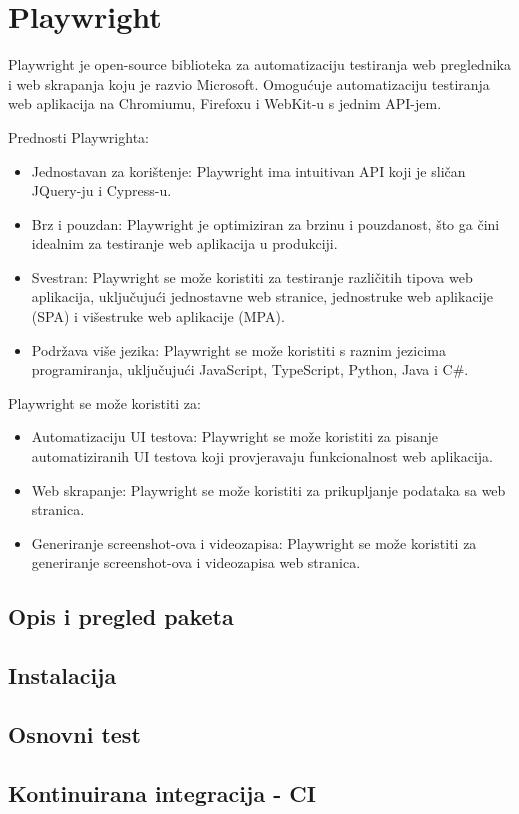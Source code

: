 \chapter{Playwright}\label{ch_playwright}
Playwright je open-source biblioteka za automatizaciju testiranja web preglednika i web skrapanja koju je razvio Microsoft. Omogućuje automatizaciju testiranja web aplikacija na Chromiumu, Firefoxu i WebKit-u s jednim API-jem.

Prednosti Playwrighta:

\begin{itemize}

\item Jednostavan za korištenje: Playwright ima intuitivan API koji je sličan JQuery-ju i Cypress-u.
\item Brz i pouzdan: Playwright je optimiziran za brzinu i pouzdanost, što ga čini idealnim za testiranje web aplikacija u produkciji.
\item Svestran: Playwright se može koristiti za testiranje različitih tipova web aplikacija, uključujući jednostavne web stranice, jednostruke web aplikacije (SPA) i višestruke web aplikacije (MPA).
\item Podržava više jezika: Playwright se može koristiti s raznim jezicima programiranja, uključujući JavaScript, TypeScript, Python, Java i C\#.
\end{itemize}

Playwright se može koristiti za:
\begin{itemize}
\item Automatizaciju UI testova: Playwright se može koristiti za pisanje automatiziranih UI testova koji provjeravaju funkcionalnost web aplikacija.
\item Web skrapanje: Playwright se može koristiti za prikupljanje podataka sa web stranica.
\item Generiranje screenshot-ova i videozapisa: Playwright se može koristiti za generiranje screenshot-ova i videozapisa web stranica.
\end{itemize}
    
\section{Opis i pregled paketa}

\section{Instalacija}

\section{Osnovni test}

\section{Kontinuirana integracija - CI}
